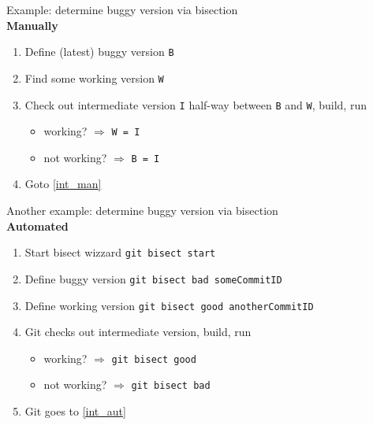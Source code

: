 \begin{frame}[fragile]
\emptyframetitle

Example: determine buggy version via bisection\\[7pt]

\textbf{Manually}
\begin{enumerate}
\item Define (latest) buggy version \texttt{B}
\item Find some working version \texttt{W}
\item Check out intermediate version \texttt{I} half-way between \texttt{B} and \texttt{W}, build, run\label{int_man}
\begin{itemize}
\item working? $\Rightarrow$ \texttt{W = I}
\item not working? $\Rightarrow$ \texttt{B = I}
\end{itemize}
\item Goto \ref{int_man}
\end{enumerate}

\end{frame}

\begin{frame}[fragile]
\emptyframetitle

Another example: determine buggy version via bisection\\[7pt]

\textbf{Automated}
\begin{enumerate}
\item Start bisect wizzard \texttt{git bisect start}
\item Define buggy version \texttt{git bisect bad someCommitID}
\item Define working version \texttt{git bisect good anotherCommitID}
\item Git checks out intermediate version, build, run\label{int_aut}
\begin{itemize}
\item working? $\Rightarrow$ \texttt{git bisect good}
\item not working? $\Rightarrow$ \texttt{git bisect bad}
\end{itemize}
\item Git goes to \ref{int_aut}
\end{enumerate}


\end{frame}

